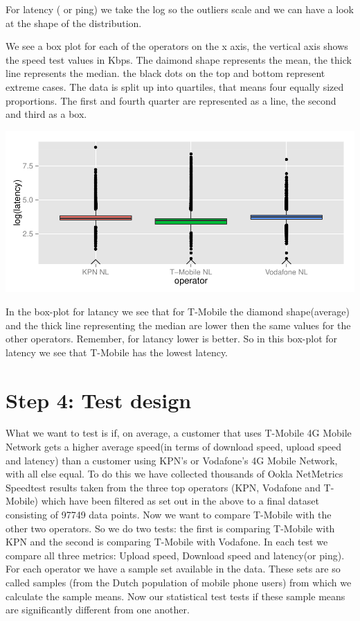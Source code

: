 \documentclass[]{article}
\begin{document}
For latency ( or ping) we take the log so the outliers scale and we can
have a look at the shape of the distribution.

We see a box plot for each of the operators on the x axis, the vertical
axis shows the speed test values in Kbps. The daimond shape represents
the mean, the thick line represents the median. the black dots on the
top and bottom represent extreme cases. The data is split up into
quartiles, that means four equally sized proportions. The first and
fourth quarter are represented as a line, the second and third as a box.

\includegraphics{speedtest-analysis_files/figure-latex/box-latency-1.pdf}

In the box-plot for latancy we see that for T-Mobile the diamond
shape(average) and the thick line representing the median are lower then
the same values for the other operators. Remember, for latancy lower is
better. So in this box-plot for latency we see that T-Mobile has the
lowest latency.

\newpage

\section{Step 4: Test design}\label{step-4-test-design}

What we want to test is if, on average, a customer that uses T-Mobile 4G
Mobile Network gets a higher average speed(in terms of download speed,
upload speed and latency) than a customer using KPN's or Vodafone's 4G
Mobile Network, with all else equal. To do this we have collected
thousands of Ookla NetMetrics Speedtest results taken from the three top
operators (KPN, Vodafone and T-Mobile) which have been filtered as set
out in the above to a final dataset consisting of 97749 data points. Now
we want to compare T-Mobile with the other two operators. So we do two
tests: the first is comparing T-Mobile with KPN and the second is
comparing T-Mobile with Vodafone. In each test we compare all three
metrics: Upload speed, Download speed and latency(or ping). For each
operator we have a sample set available in the data. These sets are so
called samples (from the Dutch population of mobile phone users) from
which we calculate the sample means. Now our statistical test tests if
these sample means are significantly different from one another.
\end{document}
